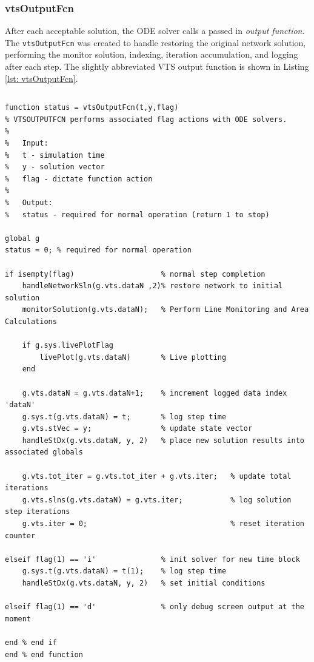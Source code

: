 
\pagebreak
\subsubsection{vtsOutputFcn} 
After each acceptable solution, the ODE solver calls a passed in \emph{output function}.
The \verb|vtsOutputFcn| was created to handle restoring the original network solution, performing the monitor solution, indexing, iteration accumulation, and logging after each step.
The slightly abbreviated VTS output function is shown in Listing \ref{lst: vtsOutputFcn}.

\pagebreak
\begin{lstlisting}[caption={Abbreviated vtsOutputFcn},label={lst: vtsOutputFcn}]
\end{lstlisting}\vspace{-2 em}
\begin{verbatim}
function status = vtsOutputFcn(t,y,flag)
% VTSOUTPUTFCN performs associated flag actions with ODE solvers.
%
%   Input:
%   t - simulation time
%   y - solution vector
%   flag - dictate function action
%
%   Output:
%   status - required for normal operation (return 1 to stop)

global g 
status = 0; % required for normal operation

if isempty(flag)                    % normal step completion
    handleNetworkSln(g.vts.dataN ,2)% restore network to initial solution   
    monitorSolution(g.vts.dataN);   % Perform Line Monitoring and Area Calculations 
    
    if g.sys.livePlotFlag
        livePlot(g.vts.dataN)       % Live plotting
    end
    
    g.vts.dataN = g.vts.dataN+1;    % increment logged data index 'dataN'
    g.sys.t(g.vts.dataN) = t;       % log step time
    g.vts.stVec = y;                % update state vector
    handleStDx(g.vts.dataN, y, 2)   % place new solution results into associated globals
    
    g.vts.tot_iter = g.vts.tot_iter + g.vts.iter;   % update total iterations
    g.vts.slns(g.vts.dataN) = g.vts.iter;           % log solution step iterations
    g.vts.iter = 0;                                 % reset iteration counter
    
elseif flag(1) == 'i'               % init solver for new time block
    g.sys.t(g.vts.dataN) = t(1);    % log step time
    handleStDx(g.vts.dataN, y, 2)   % set initial conditions
  
elseif flag(1) == 'd'               % only debug screen output at the moment

end % end if
end % end function
\end{verbatim}



